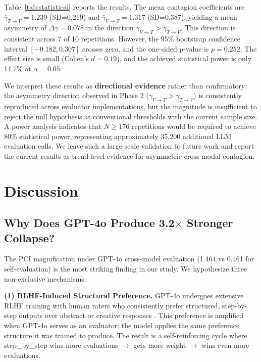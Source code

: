 \documentclass[11pt,a4paper]{article}
\begin{document}
Table~\ref{tab:statistical} reports the results. The mean contagion coefficients are $\bar{\gamma}_{T\to V}=1.239$ (SD=0.219) and $\bar{\gamma}_{V\to T}=1.317$ (SD=0.387), yielding a mean asymmetry of $\Delta\gamma=0.078$ in the direction $\gamma_{V\to T} > \gamma_{T\to V}$. This direction is consistent across 7 of 10 repetitions. However, the 95\% bootstrap confidence interval $[-0.182, 0.307]$ crosses zero, and the one-sided p-value is $p=0.252$. The effect size is small (Cohen's $d=0.19$), and the achieved statistical power is only 14.7\% at $\alpha=0.05$.

We interpret these results as \textbf{directional evidence} rather than confirmatory: the asymmetry direction observed in Phase 2 ($\gamma_{V\to T} > \gamma_{T\to V}$) is consistently reproduced across evaluator implementations, but the magnitude is insufficient to reject the null hypothesis at conventional thresholds with the current sample size. A power analysis indicates that $N\geq 176$ repetitions would be required to achieve 80\% statistical power, representing approximately 35,200 additional LLM evaluation calls. We leave such a large-scale validation to future work and report the current results as trend-level evidence for asymmetric cross-modal contagion.



\section{Discussion}

\subsection{Why Does GPT-4o Produce 3.2$\times$ Stronger Collapse?}

The PCI magnification under GPT-4o cross-model evaluation (1.464 vs 0.461 for self-evaluation) is the most striking finding in our study. We hypothesize three non-exclusive mechanisms:

\textbf{(1) RLHF-Induced Structural Preference.} GPT-4o undergoes extensive RLHF training with human raters who consistently prefer structured, step-by-step outputs over abstract or creative responses \cite{openai2024gpt4o}. This preference is amplified when GPT-4o serves as an evaluator: the model applies the same preference structure it was trained to produce. The result is a self-reinforcing cycle where step\_by\_step wins more evaluations $\rightarrow$ gets more weight $\rightarrow$ wins even more evaluations.
\end{document}
